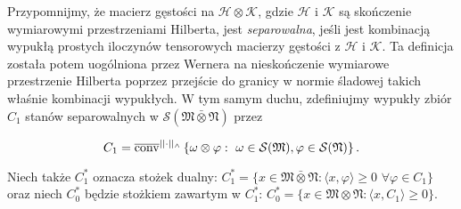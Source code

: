 Przypomnijmy, że macierz gęstości na $\mathcal{H}\otimes\mathcal{K}$,
gdzie $\mathcal{H}$ i $\mathcal{K}$
są skończenie wymiarowymi przestrzeniami Hilberta,
jest \emph{separowalna},
jeśli jest kombinacją wypukłą prostych iloczynów tensorowych macierzy gęstości
z $\mathcal{H}$ i $\mathcal{K}$.
Ta definicja została potem uogólniona przez Wernera \cite{werner1989quantum}
na nieskończenie wymiarowe przestrzenie Hilberta poprzez
przejście do granicy w normie śladowej takich właśnie kombinacji wypukłych.
W tym samym duchu, zdefiniujmy wypukły zbiór $C_1$
stanów separowalnych w
$\mathcal{S}(\mathfrak{M} \bar{\otimes} \mathfrak{N})$ przez
\begin{linenomath*}
 \begin{equation}
    \label{def:SeparableStates234}
C_{1} = \overline{{\rm conv}}^{||\cdot||_{\wedge}}
\left \{\omega \otimes \varphi: \, \,\omega \in \mathcal{S}(\mathfrak{M}),
\varphi \in \mathcal{S}(\mathfrak{N})\right \}.
 \end{equation}
\end{linenomath*}
Niech także $C_{1}^{*}$ oznacza stożek dualny:
$C_{1}^{*} = \{ x \in \mathfrak{M} \bar{\otimes} \mathfrak{N}:
 \langle x , \varphi \rangle \geq 0 \,\, \forall \varphi \in C_{1} \}$ oraz
niech $C_{0}^{*}$ będzie stożkiem zawartym w
$C_{1}^{*}$:
$C_{0}^{*} = \{ x \in \mathfrak{M} \otimes \mathfrak{N}:\langle x , C_{1} \rangle \geq 0 \}$.

